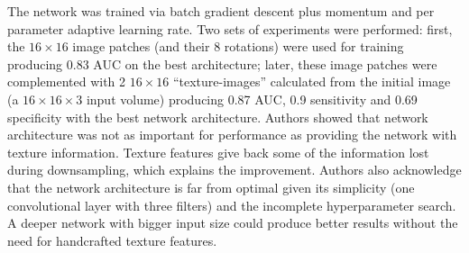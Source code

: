 The network was trained via batch gradient descent plus momentum and per parameter adaptive learning rate. Two sets of experiments were performed: first, the $16 \times 16$ image patches (and their 8 rotations) were used for training producing 0.83 AUC on the best architecture; later, these image patches were complemented with 2 $16 \times 16$ ``texture-images'' calculated from the initial image (a $16\times 16 \times 3$ input volume) producing 0.87 AUC, 0.9 sensitivity and 0.69 specificity with the best network architecture.
Authors showed that network architecture was not as important for performance as providing the network with texture information.
Texture features give back some of the information lost during downsampling, which explains the improvement. Authors also acknowledge that the network architecture is far from optimal given its simplicity (one convolutional layer with three filters) and the incomplete hyperparameter search. A deeper network with bigger input size could produce better results without the need for handcrafted texture features.




